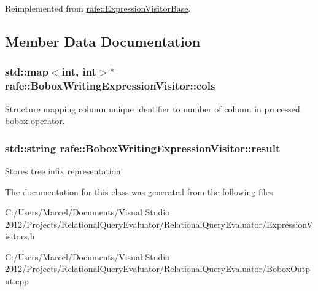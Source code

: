 Reimplemented from \hyperlink{classrafe_1_1_expression_visitor_base_a439348ee979dff26c30707f1ef499e8c}{rafe\+::\+Expression\+Visitor\+Base}.



\subsection{Member Data Documentation}
\hypertarget{classrafe_1_1_bobox_writing_expression_visitor_af77757b532d04695137bfa1a4e408f5c}{
\subsubsection[{cols}]{\setlength{\rightskip}{0pt plus 5cm}std\+::map$<$int, int$>$$\ast$ rafe\+::\+Bobox\+Writing\+Expression\+Visitor\+::cols}}\label{classrafe_1_1_bobox_writing_expression_visitor_af77757b532d04695137bfa1a4e408f5c}
Structure mapping column unique identifier to number of column in processed bobox operator. \hypertarget{classrafe_1_1_bobox_writing_expression_visitor_ad9c0ae8342d28bd95bdcec73ff55f6d9}{
\subsubsection[{result}]{\setlength{\rightskip}{0pt plus 5cm}std\+::string rafe\+::\+Bobox\+Writing\+Expression\+Visitor\+::result}}\label{classrafe_1_1_bobox_writing_expression_visitor_ad9c0ae8342d28bd95bdcec73ff55f6d9}
Stores tree infix representation. 

The documentation for this class was generated from the following files\+:\begin{DoxyCompactItemize}
\item 
C\+:/\+Users/\+Marcel/\+Documents/\+Visual Studio 2012/\+Projects/\+Relational\+Query\+Evaluator/\+Relational\+Query\+Evaluator/Expression\+Visitors.\+h\item 
C\+:/\+Users/\+Marcel/\+Documents/\+Visual Studio 2012/\+Projects/\+Relational\+Query\+Evaluator/\+Relational\+Query\+Evaluator/Bobox\+Output.\+cpp\end{DoxyCompactItemize}
